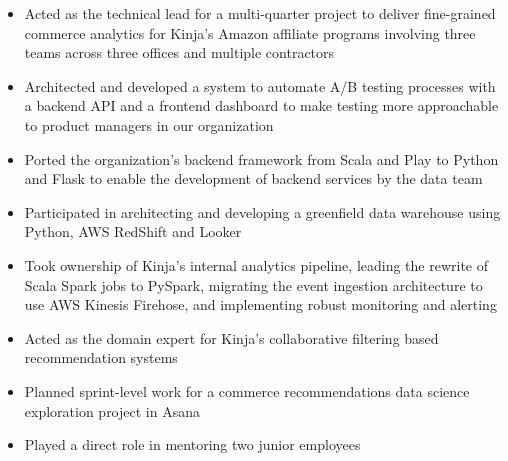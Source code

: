 \begin{itemize}
  \item Acted as the technical lead for a multi-quarter project to deliver
    fine-grained commerce analytics for Kinja's Amazon affiliate programs
    involving three teams across three offices and multiple contractors
  \item Architected and developed a system to automate A/B testing processes
    with a backend API and a frontend dashboard to make testing more
    approachable to product managers in our organization
  \item Ported the organization's backend framework from Scala and Play to
    Python and Flask to enable the development of backend services by the data
    team
  \item Participated in architecting and developing a greenfield data warehouse
    using Python, AWS RedShift and Looker
  \item Took ownership of Kinja's internal analytics pipeline, leading the
    rewrite of Scala Spark jobs to PySpark, migrating the event ingestion
    architecture to use AWS Kinesis Firehose, and implementing robust monitoring
    and alerting
  \item Acted as the domain expert for Kinja's collaborative filtering based
  recommendation systems
  \item Planned sprint-level work for a commerce recommendations data science
  exploration project in Asana
  \item Played a direct role in mentoring two junior employees
\end{itemize}
